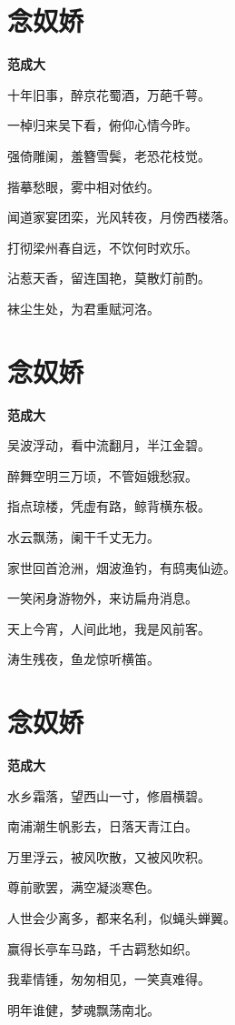 \documentclass[12pt,a4paper]{ctexbook}
\begin{document}
\section{念奴娇}
\textbf{范成大}\par\vspace{0.5em}
十年旧事，醉京花蜀酒，万葩千萼。\par
一棹归来吴下看，俯仰心情今昨。\par
强倚雕阑，羞簪雪鬓，老恐花枝觉。\par
揩摹愁眼，雾中相对依约。\par
闻道家宴团栾，光风转夜，月傍西楼落。\par
打彻梁州春自远，不饮何时欢乐。\par
沾惹天香，留连国艳，莫散灯前酌。\par
袜尘生处，为君重赋河洛。\par

\section{念奴娇}
\textbf{范成大}\par\vspace{0.5em}
吴波浮动，看中流翻月，半江金碧。\par
醉舞空明三万顷，不管姮娥愁寂。\par
指点琼楼，凭虚有路，鲸背横东极。\par
水云飘荡，阑干千丈无力。\par
家世回首沧洲，烟波渔钓，有鸱夷仙迹。\par
一笑闲身游物外，来访扁舟消息。\par
天上今宵，人间此地，我是风前客。\par
涛生残夜，鱼龙惊听横笛。\par

\section{念奴娇}
\textbf{范成大}\par\vspace{0.5em}
水乡霜落，望西山一寸，修眉横碧。\par
南浦潮生帆影去，日落天青江白。\par
万里浮云，被风吹散，又被风吹积。\par
尊前歌罢，满空凝淡寒色。\par
人世会少离多，都来名利，似蝇头蝉翼。\par
赢得长亭车马路，千古羁愁如织。\par
我辈情锺，匆匆相见，一笑真难得。\par
明年谁健，梦魂飘荡南北。\par
\end{document}
